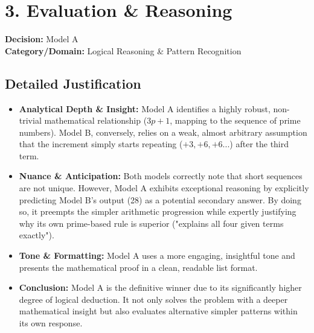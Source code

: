 \documentclass[11pt, a4paper]{article}
\begin{document}
\vspace{0.5cm}

\section*{3. Evaluation \& Reasoning}

\textbf{Decision:} Model A \\
\textbf{Category/Domain:} Logical Reasoning \& Pattern Recognition

\subsection*{Detailed Justification}
\begin{itemize}
    \item \textbf{Analytical Depth \& Insight:} Model A identifies a highly robust, non-trivial mathematical relationship ($3p + 1$, mapping to the sequence of prime numbers). Model B, conversely, relies on a weak, almost arbitrary assumption that the increment simply starts repeating ($+3, +6, +6...$) after the third term.
    \item \textbf{Nuance \& Anticipation:} Both models correctly note that short sequences are not unique. However, Model A exhibits exceptional reasoning by explicitly predicting Model B's output (28) as a potential secondary answer. By doing so, it preempts the simpler arithmetic progression while expertly justifying why its own prime-based rule is superior ("explains all four given terms exactly").
    \item \textbf{Tone \& Formatting:} Model A uses a more engaging, insightful tone and presents the mathematical proof in a clean, readable list format.
    \item \textbf{Conclusion:} Model A is the definitive winner due to its significantly higher degree of logical deduction. It not only solves the problem with a deeper mathematical insight but also evaluates alternative simpler patterns within its own response.
\end{itemize}
\end{document}
